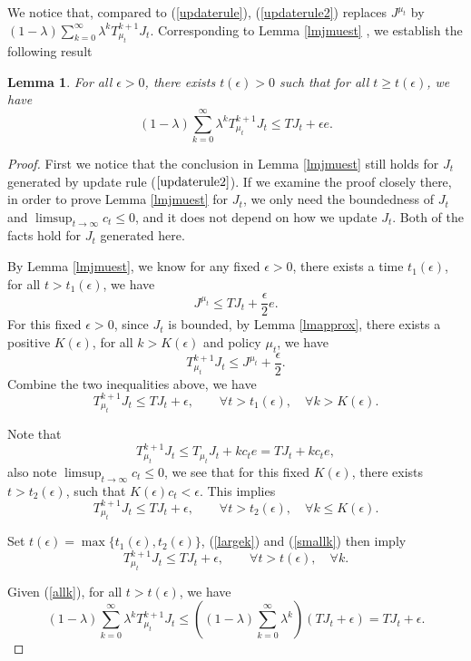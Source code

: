 \documentclass[12pt,a4paper]{amsart}
\numberwithin{equation}{section}
\theoremstyle{plain}
\newtheorem{Lemma}[Th]{Lemma}
\theoremstyle{definition}
\begin{document}
We notice that, compared to (\ref{updaterule}), (\ref{updaterule2}) replaces $J^{\mu_t}$ by $(1-\lambda) \sum_{k=0}^{\infty} \lambda^k T_{\mu_t}^{k+1} J_t$. Corresponding to Lemma \ref{lmjmuest} , we establish the following result 
\begin{Lemma} \label{lmjmuest2}
	For all $\epsilon > 0$, there exists $t(\epsilon) > 0$ such that for all $t \geq t(\epsilon)$, we have
	\begin{equation}\label{keyest2}
	(1-\lambda) \sum_{k=0}^{\infty} \lambda^k T_{\mu_t}^{k+1} J_t \leq T J_t + \epsilon e.
	\end{equation}
\end{Lemma}
\begin{proof}
	First we notice that the conclusion in Lemma \ref{lmjmuest} still holds for $J_t$ generated by update rule ($\ref{updaterule2}$). If we examine the proof closely there, in order to prove Lemma \ref{lmjmuest} for $J_t$, we only need the boundedness of $J_t$ and $\limsup_{t\to \infty} c_t \le 0 $, and it does not depend on how we update $J_t$. Both of the facts hold for $J_t$ generated here.  
	
	By Lemma \ref{lmjmuest}, we know for any fixed $\epsilon > 0$, there exists a time $t_1(\epsilon)$, for all $t > t_1(\epsilon)$, we have 
	$$
		J^{\mu_t} \le T J_t + \frac{\epsilon}{2} e. 
	$$
	For this fixed $\epsilon > 0$, since $J_t$ is bounded, by Lemma \ref{lmapprox}, there exists a positive $K(\epsilon)$, for all $k > K(\epsilon)$ and policy $\mu_t$, we have
	$$
		T_{\mu_t}^{k+1} J_t \le J^{\mu_t} + \frac{\epsilon}{2}. 
	$$
	Combine the two inequalities above,  we have
	\begin{equation} \label{largek}
		T_{\mu_t}^{k+1} J_t \le TJ_t + \epsilon,  \qquad \forall t > t_1(\epsilon),\quad  \forall k > K(\epsilon). 
	\end{equation}
	
	Note that
	$$
	T_{\mu_t}^{k+1} J_t \le T_{\mu_t} J_t + k c_t e = TJ_t + k c_t e,
	$$
	also note $\limsup_{t \to \infty} c_t\le 0$, we see that for this fixed $K(\epsilon)$, there exists $t > t_2(\epsilon)$, such that $K(\epsilon) c_t < \epsilon$. This implies
	\begin{equation}\label{smallk}
		T_{\mu_t}^{k+1} J_t \le TJ_t + \epsilon,  \qquad \forall t > t_2(\epsilon),\quad  \forall k \le K(\epsilon). 
	\end{equation}
	
	Set $t(\epsilon )= \max \{t_1(\epsilon), t_2(\epsilon)\}$, (\ref{largek}) and (\ref{smallk}) then imply
	\begin{equation} \label{allk}
		T_{\mu_t}^{k+1} J_t \le TJ_t + \epsilon,  \qquad \forall t > t(\epsilon),\quad  \forall k.
	\end{equation}
	

	
	Given (\ref{allk}), for all $t > t(\epsilon)$, we have
	$$
	(1-\lambda) \sum_{k=0}^{\infty} \lambda^k T_{\mu_t}^{k+1} J_t \leq  \left( (1-\lambda) \sum_{k=0}^{\infty} \lambda^k\right) (TJ_t + \epsilon) = TJ_t + \epsilon. 
	$$
\end{proof}
\end{document}
